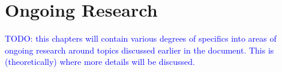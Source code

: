 \chapter{Ongoing Research}

\textcolor{blue}{TODO: this chapters will contain various degrees of specifics into areas of ongoing research around topics discussed earlier in the document. This is (theoretically) where more details will be discussed.}

\textcolor{blue}{~\cite{huang2017snapshot}}